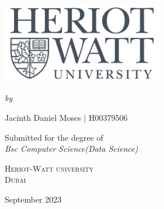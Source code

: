 \documentclass[12pt,a4paper]{report}
\author{Jacinth Daniel Moses $|$ H00379506}
\begin{document}
\begin{titlepage}
    \begin{center}
    \begin{spacing}{1.8}
    {\Large\bfseries\MakeUppercase{}}\\
    \end{spacing}
    
    \vspace{40pt}\par
    \includegraphics[width=7cm]{Figures/HWlOGO.png}
    \vspace{40pt}\par
    {\itshape\fontsize{15.5pt}{19pt}\selectfont by\\}\vspace{15pt}\par
    {\Large Jacinth Daniel Moses $|$ H00379506}\vspace{55pt}\par
    {\large Submitted for the degree of \\ \vspace{8pt} \Large\slshape{Bsc Computer Science(Data Science)}\\}
    \vspace{35pt}\par
    {\scshape{} Heriot-Watt university\\ Dubai}
    \vspace{50pt}\par
    {\large September 2023}
    \end{center}
\end{titlepage}
\end{document}
